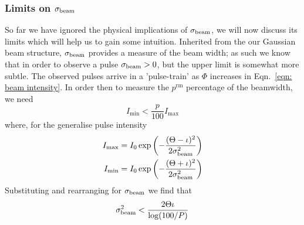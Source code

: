 \documentclass[/home/greg/Thesis/main/main.tex]{subfiles}
\begin{document}
\FloatBarrier

\subsubsection{Limits on $\sigma_{\textrm{beam}}$}
So far we have ignored the physical implications of $\sigma_{\textrm{beam}}$, we will now
discuss its limits which will help us to gain some intuition. Inherited
from the our Gaussian beam structure, $\sigma_{\textrm{beam}}$ provides a measure of the
beam width; as such we know that in order to observe a pulse $\sigma_{\textrm{beam}} > 0$, but
the upper limit is somewhat more subtle. The observed pulses arrive in a
'pulse-train' as $\Phi$ increases in Eqn.~\eqref{eqn: beam intensity}.
In order then to measure the $p^{\textrm{rm}}$ percentage of the beamwidth, we
need
\begin{equation}
I_\mathrm{min} < \frac{p}{100}I_\mathrm{max}
\end{equation}
where, for the generalise pulse intensity
\begin{align}
I_\mathrm{max} & = I_{0} \exp\left(-\frac{(\Theta - \iota)^{2}}{2\sigma_{\textrm{beam}}^{2}}\right) \\
I_\mathrm{min} & = I_{0} \exp\left(-\frac{(\Theta + \iota)^{2}}{2\sigma_{\textrm{beam}}^{2}}\right)
\end{align}
Substituting and rearranging for $\sigma_{\textrm{beam}}$ we find that
\begin{equation}
\sigma_{\textrm{beam}}^{2} < \frac{2\Theta\iota}{\log(100/P)}
\end{equation}

\biblio
\end{document}
